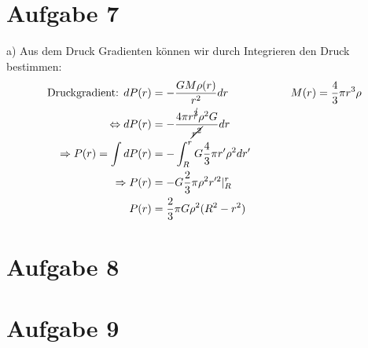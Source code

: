 \documentclass[11pt a4paper]{article}
\begin{document}
\thispagestyle{fancy}
\section*{Aufgabe 7}
\par{a)}
Aus dem Druck Gradienten können wir durch Integrieren den Druck bestimmen:
\begin{align*}
	\text{Druckgradient: }
	dP(r) &= -\frac{GM \rho(r)}{r^2} dr \hspace{2cm}
	M(r) = \frac43 \pi r^3 \rho \\
	\Leftrightarrow
	dP(r) &= -\frac{4 \pi r^{\cancel{3}} \rho^2 G}{\cancel{r^2}} dr \\
	\Rightarrow
	P(r) = \int dP(r)
	&= - \int_R^r G \frac43 \pi r^\prime \rho^2 dr^\prime \\
	\Rightarrow
	P(r) &= - G \frac23 \pi \rho^2 r^{\prime 2} \vert_R^r \\
	P(r) &= \frac23 \pi G \rho^2 (R^2 - r^2)
\end{align*}


\section*{Aufgabe 8}
\section*{Aufgabe 9}
\end{document}
